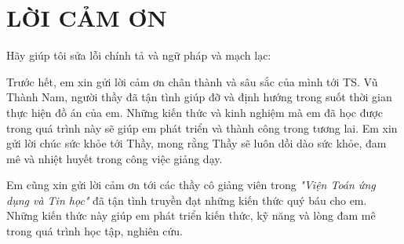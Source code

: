 \chapter*{\centering LỜI CẢM ƠN}

Hãy giúp tôi sửa lỗi chính tả và ngữ pháp và mạch lạc:

Trước hết, em xin gửi lời cảm ơn chân thành và sâu sắc của mình tới TS. Vũ Thành Nam, người thầy đã tận tình giúp đỡ và định hướng trong suốt thời gian thực hiện đồ án của em. Những kiến thức và kinh nghiệm mà em đã học được trong quá trình này sẽ giúp em phát triển và thành công trong tương lai. Em xin gửi lời chúc sức khỏe tới Thầy, mong rằng Thầy sẽ luôn dồi dào sức khỏe, đam mê và nhiệt huyết trong công việc giảng dạy.

Em cũng xin gửi lời cảm ơn tới các thầy cô giảng viên trong \textit{"Viện Toán ứng dụng và Tin học"} đã tận tình truyền đạt những kiến thức quý báu cho em. Những kiến thức này giúp em phát triển kiến thức, kỹ năng và lòng đam mê trong quá trình học tập, nghiên cứu.











